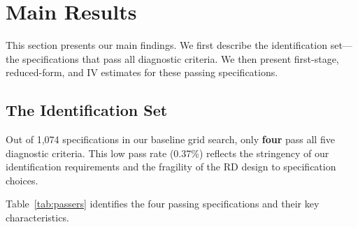\documentclass[12pt,a4paper]{article}
\begin{document}

\section{Main Results}
\label{sec:results}

This section presents our main findings. We first describe the 
identification set---the specifications that pass all diagnostic 
criteria. We then present first-stage, reduced-form, and IV estimates 
for these passing specifications.

\subsection{The Identification Set}

Out of 1,074 specifications in our baseline grid search, only 
\textbf{four} pass all five diagnostic criteria. This low pass rate 
(0.37\%) reflects the stringency of our identification requirements 
and the fragility of the RD design to specification choices.

Table~\ref{tab:passers} identifies the four passing specifications 
and their key characteristics.
\end{document}
